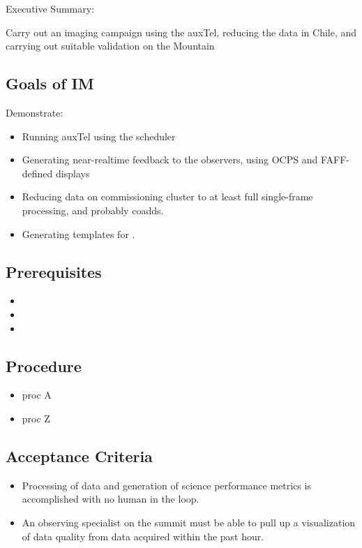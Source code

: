 
Executive Summary:

Carry out an imaging campaign using the auxTel, reducing the data in Chile, and
carrying out suitable validation on the Mountain

\subsection{Goals of IM}
Demonstrate:
\begin{itemize}
\item Running auxTel using the scheduler
\item Generating near-realtime feedback to the observers, using OCPS and FAFF-defined displays
\item Reducing data on commissioning cluster to at least full single-frame processing, and probably coadds.
\item Generating templates for .
\end{itemize}

\subsection{Prerequisites}
\begin{itemize}
\item {}
\item {}
\item {}
\end{itemize}

\subsection{Procedure}
\begin{itemize}
\item proc A
\item proc Z
\end{itemize}

\subsection{Acceptance Criteria}
\begin{itemize}
\item Processing of data and generation of science performance metrics is accomplished with no human in the loop.
\item An observing specialist on the summit must be able to pull up a visualization of data quality from data acquired within the past hour.
\end{itemize}